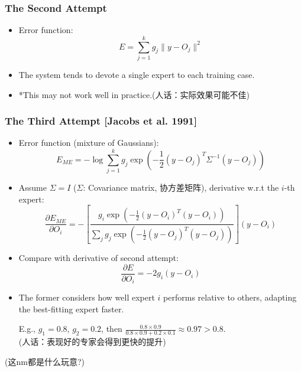\documentclass[UTF8]{ctexart}
\begin{document}
\subsubsection{The Second Attempt}
\begin{itemize}
    \item Error function:
    \[E = \sum_{j=1}^{k} g_j \| y - O_j \|^2\]
    
    \item The system tends to devote a single expert to each training case.
    
    \item *This may not work well in practice.(人话：实际效果可能不佳)
\end{itemize}

\subsubsection{The Third Attempt [Jacobs et al. 1991]}
\begin{itemize}
    \item Error function (mixture of Gaussians):
    \[E_{ME} = -\log \sum_{j=1}^{k} g_j \exp\left( -\frac{1}{2} (y - O_j)^T \Sigma^{-1} (y - O_j) \right)\]
    
    \item Assume $\Sigma = I$ ($\Sigma$: Covariance matrix, 协方差矩阵), derivative w.r.t the $i$-th expert:
    \[\frac{\partial E_{ME}}{\partial O_i} = -\left[ \frac{g_i \exp\left( -\frac{1}{2} (y - O_i)^T (y - O_i) \right)}{\sum_j g_j \exp\left( -\frac{1}{2} (y - O_j)^T (y - O_j) \right)} \right] (y - O_i)\]
    
    \item Compare with derivative of second attempt:
    \[\frac{\partial E}{\partial O_i} = -2g_i (y - O_i)\]
    
    \item The former considers how well expert $i$ performs relative to others, adapting the best-fitting expert faster.
    
    E.g., $g_1 = 0.8$, $g_2 = 0.2$, then $\frac{0.8 \times 0.9}{0.8 \times 0.9 + 0.2 \times 0.1} \approx 0.97 > 0.8$.\\
    (人话：表现好的专家会得到更快的提升)
\end{itemize}
(这nm都是什么玩意?)
\end{document}
